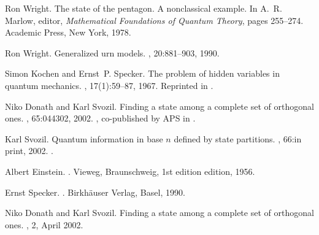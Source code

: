 \begin{thebibliography}{10}
Ron Wright.
\newblock The state of the pentagon. {A} nonclassical example.
\newblock In A.~R. Marlow, editor, {\em Mathematical Foundations of Quantum
  Theory}, pages 255--274. Academic Press, New York, 1978.

Ron Wright.
\newblock Generalized urn models.
, 20:881--903, 1990.

Simon Kochen and Ernst~P. Specker.
\newblock The problem of hidden variables in quantum mechanics.
, 17(1):59--87, 1967.
\newblock Reprinted in \cite[pp. 235--263]{specker-ges}.

Niko Donath and Karl Svozil.
\newblock Finding a state among a complete set of orthogonal ones.
, 65:044302, 2002.
, co-published by APS in \cite{DonSvo01vjqi}.

Karl Svozil.
\newblock Quantum information in base $n$ defined by state partitions.
, 66:in print, 2002.
.

Albert Einstein.
.
\newblock Vieweg, Braunschweig, 1st edition edition, 1956.

Ernst Specker.
.
\newblock Birkh{\"{a}}user Verlag, Basel, 1990.

Niko Donath and Karl Svozil.
\newblock Finding a state among a complete set of orthogonal ones.
, 2, April 2002.

\end{thebibliography}


